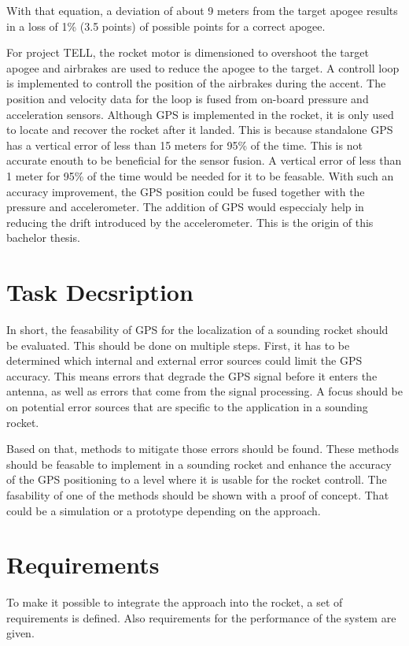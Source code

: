 With that equation, a deviation of about 9 meters from the target apogee results in a loss of 1\% (3.5 points) of possible points for a correct apogee. \cite{sac_rules2017}

For project TELL, the rocket motor is dimensioned to overshoot the target apogee and airbrakes are used to reduce the apogee to the target.
A controll loop is implemented to controll the position of the airbrakes during the accent.
The position and velocity data for the loop is fused from on-board pressure and acceleration sensors.
Although GPS is implemented in the rocket, it is only used to locate and recover the rocket after it landed.
This is because standalone GPS has a vertical error of less than 15 meters for 95\% of the time. \cite{SPS_Performance}
This is not accurate enouth to be beneficial for the sensor fusion.
A vertical error of less than 1 meter for 95\% of the time would be needed for it to be feasable.
With such an accuracy improvement, the GPS position could be fused together with the pressure and accelerometer.
The addition of GPS would especcialy help in reducing the drift introduced by the accelerometer.
This is the origin of this bachelor thesis.


\section{Task Decsription}

In short, the feasability of GPS for the localization of a sounding rocket should be evaluated.
This should be done on multiple steps.
First, it has to be determined which internal and external error sources could limit the GPS accuracy.
This means errors that degrade the GPS signal before it enters the antenna, as well as errors that come from the signal processing.
A focus should be on potential error sources that are specific to the application in a sounding rocket.

Based on that, methods to mitigate those errors should be found.
These methods should be feasable to implement in a sounding rocket and enhance the accuracy of the GPS positioning to a level where it is usable for the rocket controll.
The fasability of one of the methods should be shown with a proof of concept.
That could be a simulation or a prototype depending on the approach.


\section{Requirements}

To make it possible to integrate the approach into the rocket, a set of requirements is defined.
Also requirements for the performance of the system are given.
